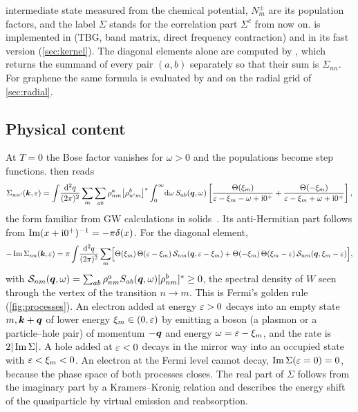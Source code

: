 intermediate state measured from the chemical potential, $N^\pm_m$ are its population factors, and the label $\Sigma$
stands for the correlation part $\Sigma^c$ from now on.  is implemented in
 (TBG, band matrix, direct frequency contraction) and in its fast version
 (\cref{sec:kernel}). The diagonal elements alone are computed by
, which returns the summand of every pair $(a,b)$ separately
so that their sum is $\Sigma_{nn}$. For graphene the same formula is evaluated by 
and  on the radial grid of \cref{sec:radial}.

\subsection{Physical content}
\label{sec:sigma_physics}

At $T=0$ the Bose factor vanishes for $\omega>0$ and the populations become step functions.  then
reads
\begin{equation}
\Sigma_{nn'}(\bm k,\varepsilon)=\int\!\frac{\mathrm d^2q}{(2\pi)^2}\sum_m\sum_{ab}\rho^a_{nm}\bigl[\rho^b_{n'm}\bigr]^*\int_0^\infty\!\mathrm d\omega\,
S_{ab}(\bm q,\omega)\left[\frac{\Theta(\xi_m)}{\varepsilon-\xi_m-\omega+\mathrm i0^+}+\frac{\Theta(-\xi_m)}{\varepsilon-\xi_m+\omega+\mathrm i0^+}\right],
\label{eq:sigmaT0}
\end{equation}
the form familiar from GW calculations in solids~\cite{HybertsenLouie1986,AryasetiawanGunnarsson1998}. Its
anti-Hermitian part follows from $\operatorname{Im}(x+\mathrm i0^+)^{-1}=-\pi\delta(x)$. For the diagonal element,
\begin{equation}
-\operatorname{Im}\Sigma_{nn}(\bm k,\varepsilon)=\pi\int\!\frac{\mathrm d^2q}{(2\pi)^2}\sum_m\Bigl[\Theta(\xi_m)\,\Theta(\varepsilon-\xi_m)\,\mathcal S_{nm}(\bm q,\varepsilon-\xi_m)
+\Theta(-\xi_m)\,\Theta(\xi_m-\varepsilon)\,\mathcal S_{nm}(\bm q,\xi_m-\varepsilon)\Bigr],
\label{eq:ImSigmaT0}
\end{equation}
with $\mathcal S_{nm}(\bm q,\omega)=\sum_{ab}\rho^a_{nm}S_{ab}(\bm q,\omega)[\rho^b_{nm}]^*\ge0$, the spectral density of $W$ seen through
the vertex of the transition $n\to m$. This is Fermi's golden rule (\cref{fig:processes}). An electron added at energy
$\varepsilon>0$ decays into an empty state $m,\bm k+\bm q$ of lower energy $\xi_m\in(0,\varepsilon)$ by emitting a boson (a plasmon or a
particle--hole pair) of momentum $-\bm q$ and energy $\omega=\varepsilon-\xi_m$, and the rate is $2|\operatorname{Im}\Sigma|$. A hole added at
$\varepsilon<0$ decays in the mirror way into an occupied state with $\varepsilon<\xi_m<0$. An electron at the Fermi level cannot
decay, $\operatorname{Im}\Sigma(\varepsilon=0)=0$, because the phase space of both processes closes. The real part of $\Sigma$ follows from
the imaginary part by a Kramers--Kronig relation and describes the energy shift of the quasiparticle by virtual
emission and reabsorption.

